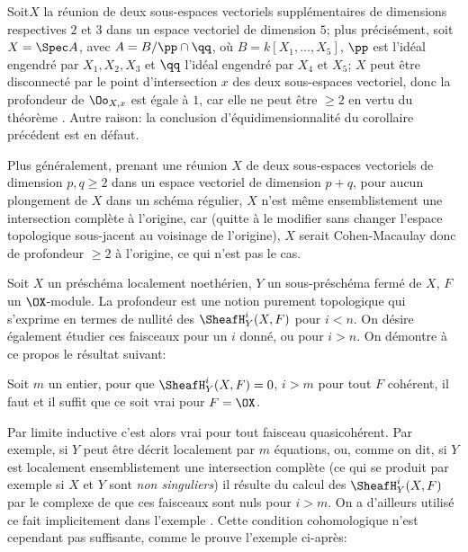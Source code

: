 \begin{exemple} \label{III.3.10}
Soit\pageoriginale $X$ la r\'eunion de deux sous-espaces vectoriels suppl\'ementaires de dimensions respectives $2$ et $3$ dans un espace vectoriel de dimension $5$; plus pr\'ecis\'ement, soit $X=\Spec A$, avec $A=B/{\pp \cap \qq}$, o\`u $B=k[X_1, \ldots, X_5]$, $\pp$ est l'id\'eal engendr\'e par $X_1, X_2, X_3$ et $\qq$ l'id\'eal engendr\'e par $X_4$ et $X_5$; $X$ peut \^etre disconnect\'e par le point d'intersection $x$ des deux sous-espaces vectoriel, donc la profondeur de $\Oo_{X, x}$ est \'egale \`a $1$, car elle ne peut \^etre $\geq 2$ en vertu du th\'eor\`eme . Autre raison: la conclusion d'\'equidimensionnalit\'e du corollaire pr\'ec\'edent est en d\'efaut.

Plus g\'en\'eralement, prenant une r\'eunion $X$ de deux sous-espaces vectoriels de dimension $p, q\geq 2$ dans un espace vectoriel de dimension $p+q$, pour aucun plongement de $X$ dans un sch\'ema r\'egulier, $X$ n'est m\^eme ensemblistement une intersection compl\`ete \`a l'origine, car (quitte \`a le modifier sans changer l'espace topologique sous-jacent au voisinage de l'origine), $X$ serait Cohen-Macaulay donc de profondeur $\geq 2$ \`a l'origine, ce qui n'est pas le cas.
\end{exemple}

\begin{remarque} \label{III.3.11}
Soit $X$ un pr\'esch\'ema localement noeth\'erien, $Y$ un sous-pr\'esch\'ema ferm\'e de $X$, $F$ un $\OX$-module. La profondeur est une notion purement topologique qui s'exprime en termes de nullit\'e des $\SheafH_Y^i(X, F)$ pour $i<n$. On d\'esire \'egalement \'etudier ces faisceaux pour un $i$ donn\'e, ou pour $i>n$. On d\'emontre \`a ce propos le r\'esultat suivant:
\end{remarque}

\begin{lemme} \label{III.3.12}
Soit $m$ un entier, pour que $\SheafH_Y^i(X, F)=0$, $i>m$ pour tout $F$ coh\'erent, il faut et il suffit que ce soit vrai pour $F=\OX$.
\end{lemme}

Par limite inductive c'est alors vrai pour tout faisceau quasi\sisi{~}{-}coh\'erent. Par exemple, si $Y$ peut \^etre d\'ecrit localement par $m$ \'equations, ou, comme on dit, si $Y$ est localement ensemblistement une intersection compl\`ete (ce qui se produit par exemple si $X$ et $Y$ sont \emph{non singuliers}) il r\'esulte du calcul des $\SheafH_Y^i(X, F)$ par le complexe de  que ces faisceaux sont nuls pour $i>m$. On a d'ailleurs utilis\'e ce fait implicitement dans l'exemple . Cette condition cohomologique n'est cependant pas suffisante, comme le prouve l'exemple ci-apr\`es:

